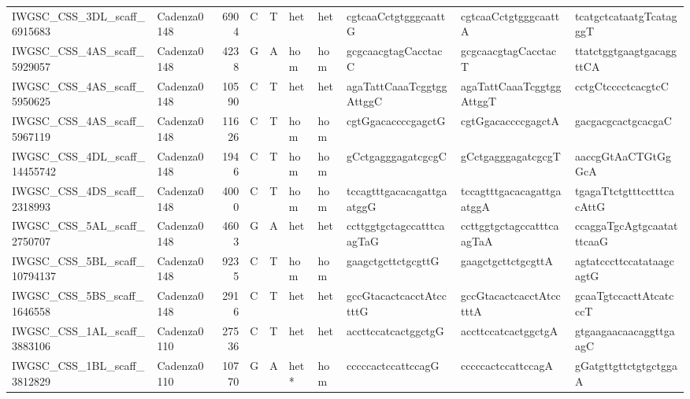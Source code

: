\begin{tabular}{llrlllllll}
 IWGSC\_CSS\_3DL\_scaff\_6915683  & Cadenza0148 &       6904 & C         & T        & het            & het         & cgtcaaCctgtgggcaattG      & cgtcaaCctgtgggcaattA      & tcatgctcataatgTcatagggT   \\
 IWGSC\_CSS\_4AS\_scaff\_5929057  & Cadenza0148 &       4238 & G         & A        & hom            & hom         & gcgcaacgtagCacctacC       & gcgcaacgtagCacctacT       & ttatctggtgaagtgacaggttCA  \\
 IWGSC\_CSS\_4AS\_scaff\_5950625  & Cadenza0148 &      10590 & C         & T        & het            & het         & agaTattCaaaTcggtggAttggC  & agaTattCaaaTcggtggAttggT  & cctgCtcccctcacgtcC        \\
 IWGSC\_CSS\_4AS\_scaff\_5967119  & Cadenza0148 &      11626 & C         & T        & hom            & hom         & cgtGgacaccccgagctG        & cgtGgacaccccgagctA        & gacgacgcactgcacgaC        \\
 IWGSC\_CSS\_4DL\_scaff\_14455742 & Cadenza0148 &       1946 & C         & T        & hom            & hom         & gCctgagggagatcgcgC        & gCctgagggagatcgcgT        & aaccgGtAaCTGtGgGcA        \\
 IWGSC\_CSS\_4DS\_scaff\_2318993  & Cadenza0148 &       4000 & C         & T        & hom            & hom         & tccagtttgacacagattgaatggG & tccagtttgacacagattgaatggA & tgagaTtctgtttcctttcacAttG \\
 IWGSC\_CSS\_5AL\_scaff\_2750707  & Cadenza0148 &       4603 & G         & A        & het            & het         & ccttggtgctagccatttcaagTaG & ccttggtgctagccatttcaagTaA & ccaggaTgcAgtgcaatatttcaaG \\
 IWGSC\_CSS\_5BL\_scaff\_10794137 & Cadenza0148 &       9235 & C         & T        & hom            & hom         & gaagctgcttctgcgttG        & gaagctgcttctgcgttA        & agtatcccttccatataagcagtG  \\
 IWGSC\_CSS\_5BS\_scaff\_1646558  & Cadenza0148 &       2916 & C         & T        & het            & het         & gccGtacactcacctAtcctttG   & gccGtacactcacctAtcctttA   & gcaaTgtccacttAtcatcccT    \\
 IWGSC\_CSS\_1AL\_scaff\_3883106  & Cadenza0110 &      27536 & C         & T        & het            & het         & accttccatcactggctgG       & accttccatcactggctgA       & gtgaagaacaacaggttgaagC    \\
 IWGSC\_CSS\_1BL\_scaff\_3812829  & Cadenza0110 &      10770 & G         & A        & het*           & hom         & cccccactccattccagG        & cccccactccattccagA        & gGatgttgttctgtgctggaA     \\

\end{tabular}
